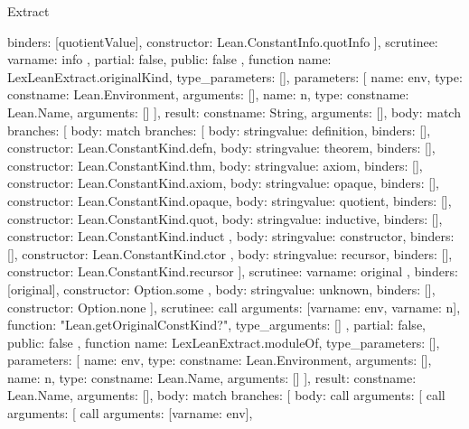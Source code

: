 \begin{lexlean}{Extract}
\begin{toolingmodule}
{{{{            binders: [quotientValue],
            constructor: Lean.ConstantInfo.quotInfo
          }
        ],
        scrutinee: var{name: info}
      },
      partial: false,
      public: false
    },
    function{
      name: LexLeanExtract.originalKind,
      type_parameters: [],
      parameters: [
        {name: env, type: const{name: Lean.Environment, arguments: []}},
        {name: n, type: const{name: Lean.Name, arguments: []}}
      ],
      result: const{name: String, arguments: []},
      body: match{
        branches: [
          {
            body: match{
              branches: [
                {body: string{value: definition}, binders: [], constructor: Lean.ConstantKind.defn},
                {body: string{value: theorem}, binders: [], constructor: Lean.ConstantKind.thm},
                {body: string{value: axiom}, binders: [], constructor: Lean.ConstantKind.axiom},
                {body: string{value: opaque}, binders: [], constructor: Lean.ConstantKind.opaque},
                {body: string{value: quotient}, binders: [], constructor: Lean.ConstantKind.quot},
                {
                  body: string{value: inductive},
                  binders: [],
                  constructor: Lean.ConstantKind.induct
                },
                {
                  body: string{value: constructor},
                  binders: [],
                  constructor: Lean.ConstantKind.ctor
                },
                {
                  body: string{value: recursor},
                  binders: [],
                  constructor: Lean.ConstantKind.recursor
                }
              ],
              scrutinee: var{name: original}
            },
            binders: [original],
            constructor: Option.some
          },
          {body: string{value: unknown}, binders: [], constructor: Option.none}
        ],
        scrutinee: call{
          arguments: [var{name: env}, var{name: n}],
          function: "Lean.getOriginalConstKind?",
          type_arguments: []
        }
      },
      partial: false,
      public: false
    },
    function{
      name: LexLeanExtract.moduleOf,
      type_parameters: [],
      parameters: [
        {name: env, type: const{name: Lean.Environment, arguments: []}},
        {name: n, type: const{name: Lean.Name, arguments: []}}
      ],
      result: const{name: Lean.Name, arguments: []},
      body: match{
        branches: [
          {
            body: call{
              arguments: [
                call{
                  arguments: [
                    call{
                      arguments: [var{name: env}],
}}}}}}}
\end{toolingmodule}
\end{lexlean}
